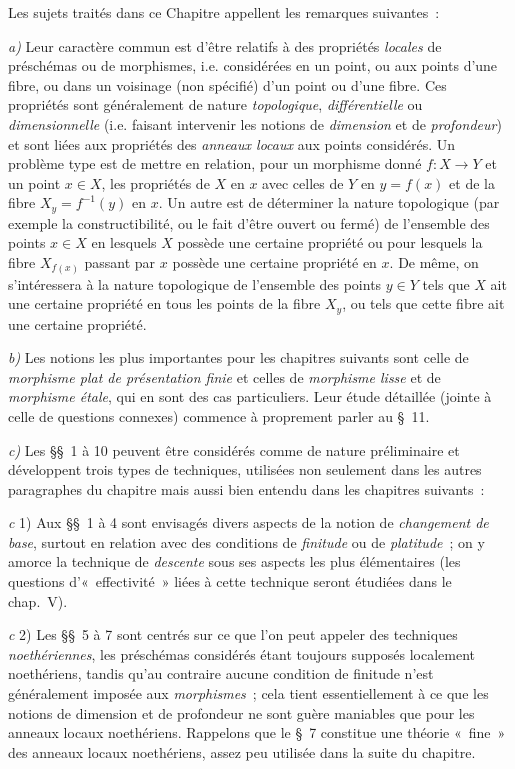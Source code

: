 \clearpage
{}

Les sujets traités dans ce Chapitre appellent les remarques suivantes~:

\medskip
\noindent
\emph{a)} Leur caractère commun est d'être relatifs à des propriétés
\emph{locales} de préschémas ou de morphismes, i.e. considérées en un point,
ou aux points d'une fibre, ou dans un voisinage (non spécifié) d'un point ou
d'une fibre. Ces propriétés sont généralement de nature \emph{topologique},
\emph{différentielle} ou \emph{dimensionnelle} (i.e. faisant intervenir les
notions de \emph{dimension} et de \emph{profondeur}) et sont liées aux
propriétés des \emph{anneaux locaux} aux points considérés. Un problème type
est de mettre en relation, pour un morphisme donné $f:X\to Y$ et un point
$x\in X$, les propriétés de $X$ en $x$ avec celles de $Y$ en $y=f(x)$ et de
la fibre $X_y=f^{-1}(y)$ en $x$. Un autre est de déterminer la nature
topologique (par exemple la constructibilité, ou le fait d'être ouvert ou
fermé) de l'ensemble des points $x\in X$ en lesquels $X$ possède une certaine
propriété ou pour lesquels la fibre $X_{f(x)}$ passant par $x$ possède une
certaine propriété en $x$. De même, on s'intéressera à la nature topologique
de l'ensemble des points $y\in Y$ tels que $X$ ait une certaine propriété en
tous les points de la fibre $X_y$, ou tels que cette fibre ait une certaine
propriété.

\medskip
\noindent
\emph{b)} Les notions les plus importantes pour les chapitres suivants sont
celle de \emph{morphisme plat de présentation finie} et celles de
\emph{morphisme lisse} et de \emph{morphisme étale}, qui en sont des cas
particuliers. Leur étude détaillée (jointe à celle de questions connexes)
commence à proprement parler au §~11.

\medskip
\noindent
\emph{c)} Les §§~1 à 10 peuvent être considérés comme de nature préliminaire
et développent trois types de techniques, utilisées non seulement dans les
autres paragraphes du chapitre mais aussi bien entendu dans les chapitres
suivants~:

\medskip
\noindent
\emph{c} 1) Aux §§~1 à 4 sont envisagés divers aspects de la notion de
\emph{changement de base}, surtout en relation avec des conditions de
\emph{finitude} ou de \emph{platitude}~; on y amorce la technique de
\emph{descente} sous ses aspects les plus élémentaires (les questions
d'«~effectivité~» liées à cette technique seront étudiées dans le chap.~V).

\medskip
\noindent
\emph{c} 2) Les §§~5 à 7 sont centrés sur ce que l'on peut appeler des
techniques \emph{noethériennes}, les préschémas considérés étant toujours
supposés localement noethériens, tandis qu'au contraire aucune condition de
finitude n'est généralement imposée aux \emph{morphismes}~; cela tient
essentiellement à ce que les notions de dimension et de profondeur ne sont
guère maniables que pour les anneaux locaux noethériens. Rappelons que le §~7
constitue une théorie «~fine~» des anneaux locaux noethériens, assez peu
utilisée dans la suite du chapitre.

